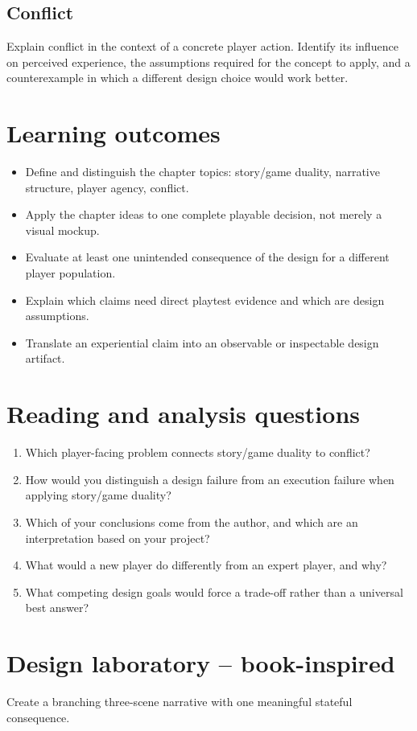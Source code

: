 \documentclass[11pt]{article}
\begin{document}
\subsection{Conflict}
Explain conflict in the context of a concrete player action. Identify its influence on perceived experience, the assumptions required for the concept to apply, and a counterexample in which a different design choice would work better.


\section{Learning outcomes}
\begin{itemize}
\item Define and distinguish the chapter topics: story/game duality, narrative structure, player agency, conflict.
\item Apply the chapter ideas to one complete playable decision, not merely a visual mockup.
\item Evaluate at least one unintended consequence of the design for a different player population.
\item Explain which claims need direct playtest evidence and which are design assumptions.
\item Translate an experiential claim into an observable or inspectable design artifact.
\end{itemize}

\section{Reading and analysis questions}
\begin{enumerate}
\item Which player-facing problem connects story/game duality to conflict?
\item How would you distinguish a design failure from an execution failure when applying story/game duality?
\item Which of your conclusions come from the author, and which are an interpretation based on your project?
\item What would a new player do differently from an expert player, and why?
\item What competing design goals would force a trade-off rather than a universal best answer?
\end{enumerate}

\section{Design laboratory -- book-inspired}
Create a branching three-scene narrative with one meaningful stateful consequence.
\end{document}
